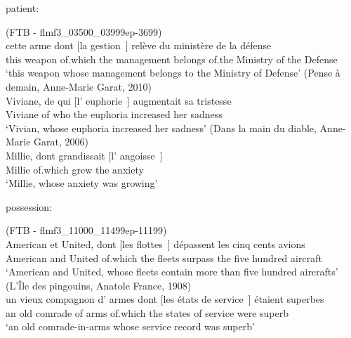 \begin{exe}
\ex patient: \label{ex:patient}
\begin{xlist}
\ex (FTB - flmf3\_03500\_03999ep-3699)\\
\gll cette arme dont [la gestion~\trace{}] relève du ministère de la défense\\
this weapon of.which the management belongs of.the Ministry of the Defense\\
\glt `this weapon whose management belongs to the Ministry of Defense'
\ex (Pense à demain, Anne-Marie Garat, 2010)\\
\gll Viviane, de qui [l' euphorie~\trace{}] augmentait sa tristesse\\
Viviane of who the euphoria increased her sadness\\
\glt `Vivian, whose euphoria increased her sadness'
\ex (Dans la main du diable, Anne-Marie Garat, 2006)\\
\gll Millie, dont grandissait [l' angoisse~\trace{}]\\
Millie of.which grew the anxiety\\
\glt `Millie, whose anxiety was growing'
\end{xlist}

\ex possession: \label{ex:possession-relation}
\begin{xlist}
\ex (FTB - flmf3\_11000\_11499ep-11199)\\
\gll American et United, dont [les flottes~\trace{}] dépassent les cinq cents avions\\
American and United of.which the fleets surpass the five hundred aircraft\\
\glt `American and United, whose fleets contain more than five hundred aircrafts'
\ex(L'Île des pingouins, Anatole France, 1908)\\
\gll un vieux compagnon d' armes dont [les états de service~\trace{}] étaient superbes\\
an old comrade of arms of.which the states of service were superb\\
\glt `an old comrade-in-arms whose service record was superb'
\end{xlist}


\end{exe}
